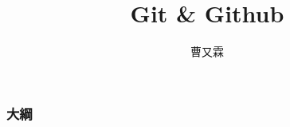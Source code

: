 \documentclass[pdf,15pt]{beamer}
\title{Git \& Github}
\author{曹又霖}
\begin{document}
  \begin{frame}
    \titlepage
  \end{frame}
  
  \begin{frame}
    \frametitle{大綱} %
    \tableofcontents %
  \end{frame}
  
\end{document}
